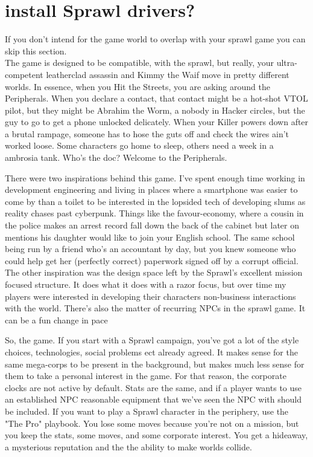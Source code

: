 \documentclass{tufte-book}
\begin{document}
\section{install Sprawl drivers?} \label{sec: the sprawl}

If you don't intend for the game world to overlap with your sprawl game you can skip this section. \\

The game is designed to be compatible, with the sprawl, but really, your ultra-competent leatherclad assassin and Kimmy the Waif move in pretty different worlds. In essence, when you Hit the Streets, you are asking around the Peripherals. When you declare a contact, that contact might be a hot-shot VTOL pilot, but they might be Abrahim the Worm, a nobody in Hacker circles, but the guy to go to get a phone unlocked delicately. When your Killer powers down after a brutal rampage, someone has to hose the guts off and check the wires ain't worked loose. Some characters go home to sleep, others need a week in a ambrosia tank. Who's the doc?
Welcome to the Peripherals. 

There were two inspirations behind this game. I've spent enough time working in development engineering and living in places where a smartphone was easier to come by than a toilet to be interested in the lopsided tech of developing slums as reality chases past cyberpunk. Things like the favour-economy, where a cousin in the police makes an arrest record fall down the back of the cabinet but later on mentions his daughter would like to join your English school.  The same school being run by a friend who's an accountant by day, but you knew someone who could help get her (perfectly correct) paperwork signed off by a corrupt official. The other inspiration was the design space left by the Sprawl's excellent mission focused structure. It does what it does with a razor focus, but over time my players were interested in developing their characters non-business interactions with the world. There's also the matter of recurring NPCs in the sprawl game. It can be a fun change in pace 

So, the game. If you start with a Sprawl campaign, you've got a lot of the style choices, technologies, social problems ect already agreed. It makes sense for the same mega-corps to be present in the background, but makes much less sense for them to take a personal interest in the game. For that reason, the corporate clocks are not active by default. Stats are the same, and if a player wants to use an established NPC reasonable equipment that we've seen the NPC with should be included. If you want to play a Sprawl character in the periphery, use the "The Pro" playbook. You lose some moves because you're not on a mission, but you keep the stats, some moves, and some corporate interest. You get a hideaway, a mysterious reputation and the the ability to make worlds collide.
\end{document}
